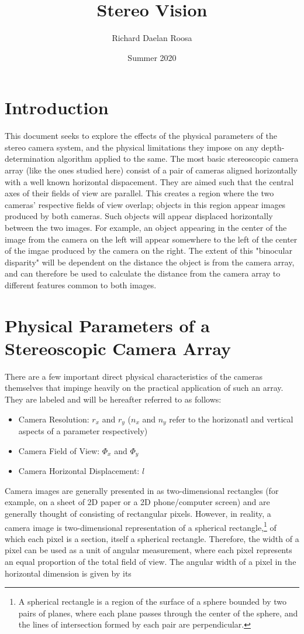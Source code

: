 \documentclass{article}
\title{Stereo Vision}
\author{Richard Daelan Roosa}
\date{Summer 2020}
\begin{document}
\maketitle

\section{Introduction}
This document seeks to explore the effects of the physical parameters of the stereo camera system, and the physical limitations they impose on any depth-determination algorithm applied to the same.
The most basic stereoscopic camera array (like the ones studied here) consist of a pair of cameras aligned horizontally with a well known horizontal dispacement.
They are aimed such that the central axes of their fields of view are parallel.
This creates a region where the two cameras' respective fields of view overlap; objects in this region appear images produced by both cameras.
Such objects will appear displaced horizontally between the two images.
For example, an object appearing in the center of the image from the camera on the left will appear somewhere to the left of the center of the imgae produced by the camera on the right.
The extent of this "binocular disparity" will be dependent on the distance the object is from the camera array, and can therefore be used to calculate the distance from the camera array to different features common to both images.

\section{Physical Parameters of a Stereoscopic Camera Array}
There are a few important direct physical characteristics of the cameras themselves that impinge heavily on the practical application of such an array.
They are labeled and will be hereafter referred to as follows:

\begin{itemize}
    \item Camera Resolution: $r_x$ and $r_y$ ($n_x$ and $n_y$ refer to the horizonatl and vertical aspects of a parameter respectively)
    \item Camera Field of View: $\Phi_x$ and $\Phi_y$
    \item Camera Horizontal Displacement: $l$
\end{itemize}

Camera images are generally presented in as two-dimensional rectangles (for example, on a sheet of 2D paper or a 2D phone/computer screen) and are generally thought of consisting of rectangular pixels.
However, in reality, a camera image is two-dimensional representation of a spherical rectangle,\footnote{A spherical rectangle is a region of the surface of a sphere bounded by two pairs of planes, where each plane passes through the center of the sphere, and the lines of intersection formed by each pair are perpendicular.} of which each pixel is a section, itself a spherical rectangle.
Therefore, the width of a pixel can be used as a unit of angular measurement, where each pixel represents an equal proportion of the total field of view.
The angular width of a pixel in the horizontal dimension is given by its  
\end{document}
